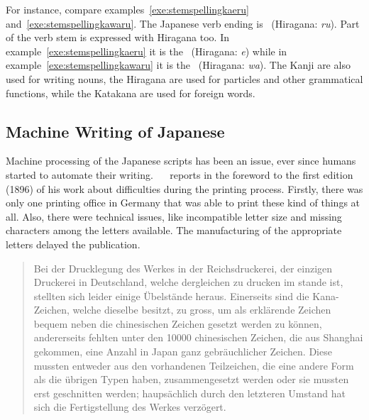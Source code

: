 For instance, compare examples~\ref{exe:stemspellingkaeru}
and~\ref{exe:stemspellingkawaru}. 
The Japanese verb ending is 
~(Hiragana: \emph{ru}). Part of the verb stem is expressed with
Hiragana too. In example~\ref{exe:stemspellingkaeru} it is the 
~(Hiragana: \emph{e}) while in example~\ref{exe:stemspellingkawaru} 
it is the ~(Hiragana: \emph{wa}).
The Kanji are also used for writing nouns, the Hiragana are used for particles 
and other grammatical functions, while the Katakana are used for foreign words.


\subsection{Machine Writing of Japanese}
\label{sec:machinewritingofjapanese}

Machine processing of the Japanese scripts has been an issue, ever since humans
started to automate their writing. 
~~\citeyear{Lange1922} reports in the foreword to the 
first edition (1896) of his work about difficulties during the printing process. 
Firstly, there was only one printing office in Germany that was able to print 
these kind of things at all. Also, there were technical issues, 
like incompatible letter size and missing characters among the letters 
available. The manufacturing of the appropriate letters delayed the publication.
\begin{quote}
Bei der Drucklegung des Werkes in der Reichsdruckerei, der einzigen Druckerei 
in Deutschland, welche dergleichen zu drucken im stande ist, stellten sich 
leider einige Übelstände heraus. Einerseits sind die Kana-Zeichen, 
welche dieselbe besitzt, zu gross, um als erklärende Zeichen bequem neben die 
chinesischen Zeichen gesetzt werden zu können, andererseits fehlten unter den 
10000 chinesischen Zeichen, die aus Shanghai gekommen, eine Anzahl in Japan 
ganz gebräuchlicher Zeichen. 
Diese mussten entweder aus den vorhandenen Teilzeichen,
die eine andere Form als die übrigen Typen haben, zusammengesetzt werden oder 
sie mussten erst geschnitten werden; 
haupsächlich durch den letzteren Umstand hat sich die Fertigstellung des Werkes 
verzögert.
\end{quote}

